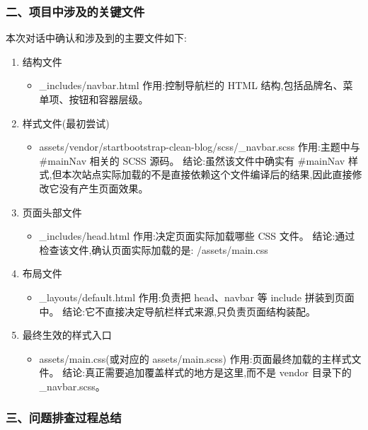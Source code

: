 \documentclass[lang=cn,scheme=chinese,color=blue,device=normal,toc=onecol,math=cm]{elegantbook}
\begin{document}
\subsubsection{二、项目中涉及的关键文件}


本次对话中确认和涉及到的主要文件如下:\par


\begin{enumerate}
\item 结构文件 
\begin{itemize}
\item \_\allowbreak{}includes/\allowbreak{}navbar.html 作用:控制导航栏的 HTML 结构,包括品牌名、菜单项、按钮和容器层级。
\end{itemize}
\item 样式文件(最初尝试) 
\begin{itemize}
\item assets/\allowbreak{}vendor/\allowbreak{}startbootstrap-clean-blog/\allowbreak{}scss/\allowbreak{}\_\allowbreak{}navbar.scss 作用:主题中与 \#mainNav 相关的 SCSS 源码。 结论:虽然该文件中确实有 \#mainNav 样式,但本次站点实际加载的不是直接依赖这个文件编译后的结果,因此直接修改它没有产生页面效果。
\end{itemize}
\item 页面头部文件 
\begin{itemize}
\item \_\allowbreak{}includes/\allowbreak{}head.html 作用:决定页面实际加载哪些 CSS 文件。 结论:通过检查该文件,确认页面实际加载的是: /\allowbreak{}assets/\allowbreak{}main.css
\end{itemize}
\item 布局文件 
\begin{itemize}
\item \_\allowbreak{}layouts/\allowbreak{}default.html 作用:负责把 head、navbar 等 include 拼装到页面中。 结论:它不直接决定导航栏样式来源,只负责页面结构装配。
\end{itemize}
\item 最终生效的样式入口 
\begin{itemize}
\item assets/\allowbreak{}main.css(或对应的 assets/\allowbreak{}main.scss) 作用:页面最终加载的主样式文件。 结论:真正需要追加覆盖样式的地方是这里,而不是 vendor 目录下的 \_\allowbreak{}navbar.scss。
\end{itemize}
\end{enumerate}


\subsubsection{三、问题排查过程总结}
\end{document}
